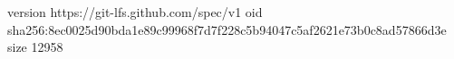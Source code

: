 version https://git-lfs.github.com/spec/v1
oid sha256:8ec0025d90bda1e89c99968f7d7f228c5b94047c5af2621e73b0c8ad57866d3e
size 12958
